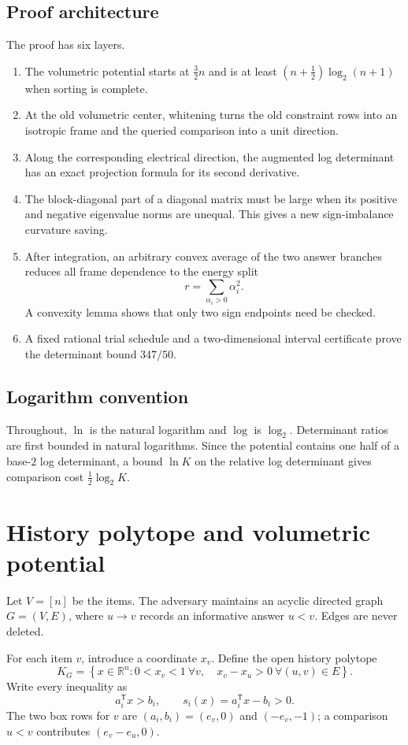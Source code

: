 \documentclass[11pt]{article}
\theoremstyle{definition}
\newcommand{\R}{\mathbb{R}}
\begin{document}
\subsection{Proof architecture}
The proof has six layers.
\begin{enumerate}[label=(\roman*)]
  \item The volumetric potential starts at $\frac32n$ and is at least $(n+\frac12)\log_2(n+1)$ when sorting is complete.
  \item At the old volumetric center, whitening turns the old constraint rows into an isotropic frame and the queried comparison into a unit direction.
  \item Along the corresponding electrical direction, the augmented log determinant has an exact projection formula for its second derivative.
  \item The block-diagonal part of a diagonal matrix must be large when its positive and negative eigenvalue norms are unequal.  This gives a new sign-imbalance curvature saving.
  \item After integration, an arbitrary convex average of the two answer branches reduces all frame dependence to the energy split
  \[
    r=\sum_{\alpha_i>0}\alpha_i^2.
  \]
  A convexity lemma shows that only two sign endpoints need be checked.
  \item A fixed rational trial schedule and a two-dimensional interval certificate prove the determinant bound $347/50$.
\end{enumerate}

\subsection{Logarithm convention}
Throughout, $\ln$ is the natural logarithm and $\log$ is $\log_2$.  Determinant ratios are first bounded in natural logarithms.  Since the potential contains one half of a base-$2$ log determinant, a bound $\ln K$ on the relative log determinant gives comparison cost $\frac12\log_2K$.

\section{History polytope and volumetric potential}

Let $V=[n]$ be the items.  The adversary maintains an acyclic directed graph $G=(V,E)$, where $u\to v$ records an informative answer $u<v$.  Edges are never deleted.

For each item $v$, introduce a coordinate $x_v$.  Define the open history polytope
\begin{equation}
  K_G=\left\{x\in\R^n:
  0<x_v<1\ \forall v,\quad x_v-x_u>0\ \forall (u,v)\in E
  \right\}.
  \label{eq:history-polytope}
\end{equation}
Write every inequality as
\[
  a_i^{\mathsf T}x>b_i,
  \qquad
  s_i(x)=a_i^{\mathsf T}x-b_i>0.
\]
The two box rows for $v$ are $(a_i,b_i)=(e_v,0)$ and $(-e_v,-1)$; a comparison $u<v$ contributes $(e_v-e_u,0)$.
\end{document}
